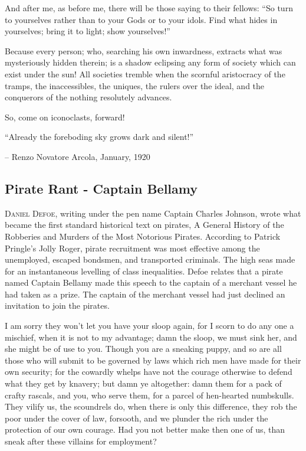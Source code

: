 \documentclass[a4paper,english,10pt,twoside]{article}
\begin{document}
\medskip
And after me, as before me, there will be those saying to their fellows: \enquote{So turn to yourselves rather than to your Gods or to your idols. Find what hides in yourselves; bring it to light; show yourselves!}

\medskip
Because every person; who, searching his own inwardness, extracts what was mysteriously hidden therein; is a shadow eclipsing any form of society which can exist under the sun! All societies tremble when the scornful aristocracy of the tramps, the inaccessibles, the uniques, the rulers over the ideal, and the conquerors of the nothing resolutely advances.

\medskip
\noindent So, come on iconoclasts, forward!

\medskip
\noindent \enquote{Already the foreboding sky grows dark and silent!}

\begin{flushright} -- Renzo Novatore Arcola, January, 1920\end{flushright}

\subsection{Pirate Rant - Captain Bellamy}

\lettrine{D}{aniel Defoe}, writing under the pen name Captain Charles Johnson, wrote what became the first standard historical text on pirates, A General History of the Robberies and Murders of the Most Notorious Pirates. According to Patrick Pringle's Jolly Roger, pirate recruitment was most effective among the unemployed, escaped bondsmen, and transported criminals. The high seas made for an instantaneous levelling of class inequalities. Defoe relates that a pirate named Captain Bellamy made this speech to the captain of a merchant vessel he had taken as a prize. The captain of the merchant vessel had just declined an invitation to join the pirates.

\medskip
I am sorry they won't let you have your sloop again, for I scorn to do any one a mischief, when it is not to my advantage; damn the sloop, we must sink her, and she might be of use to you. Though you are a sneaking puppy, and so are all those who will submit to be governed by laws which rich men have made for their own security; for the cowardly whelps have not the courage otherwise to defend what they get by knavery; but damn ye altogether: damn them for a pack of crafty rascals, and you, who serve them, for a parcel of hen-hearted numbskulls. They vilify us, the scoundrels do, when there is only this difference, they rob the poor under the cover of law, forsooth, and we plunder the rich under the protection of our own courage. Had you not better make then one of us, than sneak after these villains for employment?
\end{document}
